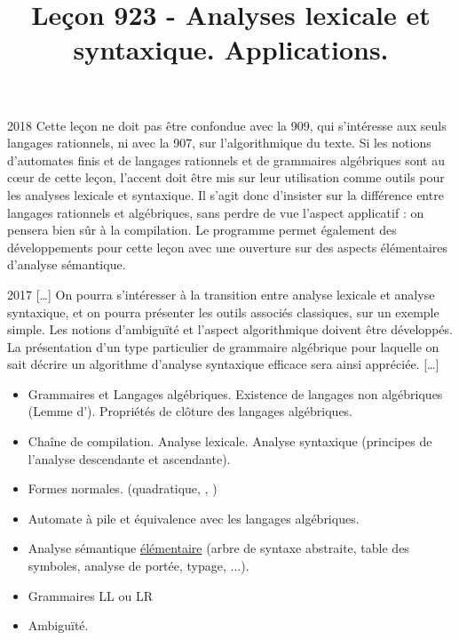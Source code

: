 \documentclass{agregfiche}
\title{Leçon 923 - Analyses lexicale et syntaxique. Applications.}
\begin{document}
\maketitle

\secrapports
\begin{rapport}{2018}
    Cette leçon ne doit pas être confondue avec la 909, qui s’intéresse aux seuls langages rationnels, ni avec
    la 907, sur l’algorithmique du texte.
    Si les notions d’automates finis et de langages rationnels et de grammaires algébriques sont au cœur
    de cette leçon, l’accent doit être mis sur leur utilisation comme outils pour les analyses lexicale et
    syntaxique. Il s’agit donc d’insister sur la différence entre langages rationnels et algébriques, sans perdre
    de vue l’aspect applicatif : on pensera bien sûr à la compilation. Le programme permet également des
    développements pour cette leçon avec une ouverture sur des aspects élémentaires d’analyse sémantique.
\end{rapport}

\begin{rapport}{2017}
[\dots]    On pourra s’intéresser à la transition entre analyse lexicale et analyse syntaxique, et on pourra présenter les outils associés classiques, sur un exemple
    simple. Les notions d’ambiguïté et l’aspect algorithmique doivent être développés. La présentation
    d’un type particulier de grammaire algébrique pour laquelle on sait décrire un algorithme d’analyse
    syntaxique efficace sera ainsi appréciée. [\dots]
    \end{rapport}

\secindispensables

\begin{itemize}
	\item Grammaires et Langages algébriques. Existence de langages non algébriques (Lemme d'). Propriétés de clôture
    des langages algébriques.
    \item Chaîne de compilation. Analyse lexicale. Analyse syntaxique (principes de l’analyse descendante
    et ascendante).
\end{itemize}

\secasavoir

\begin{itemize}
    \item Formes normales. (quadratique, , )
    \item Automate à pile et équivalence avec les langages algébriques.
    \item Analyse sémantique \underline{élémentaire} (arbre de syntaxe abstraite, table des symboles,
    analyse de portée, typage, ...).
    \item Grammaires LL ou LR
    \item Ambiguïté.
\end{itemize}
\end{document}
